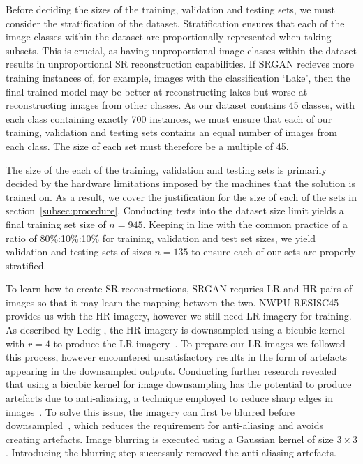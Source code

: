 Before deciding the sizes of the training, validation and testing sets, we must consider the stratification of the dataset. Stratification ensures that each of the image classes within the dataset are proportionally represented when taking subsets. This is crucial, as having unproportional image classes within the dataset results in unproportional SR reconstruction capabilities. If SRGAN recieves more training instances of, for example, images with the classification `Lake', then the final trained model may be better at reconstructing lakes but worse at reconstructing images from other classes. As our dataset contains 45 classes, with each class containing exactly 700 instances, we must ensure that each of our training, validation and testing sets contains an equal number of images from each class. The size of each set must therefore be a multiple of 45.

The size of the each of the training, validation and testing sets is primarily decided by the hardware limitations imposed by the machines that the solution is trained on. As a result, we cover the justification for the size of each of the sets in section~\ref{subsec:procedure}. Conducting tests into the dataset size limit yields a final training set size of $n = 945$. Keeping in line with the common practice of a ratio of 80\%:10\%:10\% for training, validation and test set sizes, we yield validation and testing sets of sizes $n = 135$ to ensure each of our sets are properly stratified.

To learn how to create SR reconstructions, SRGAN requries LR and HR pairs of images so that it may learn the mapping between the two. NWPU-RESISC45 provides us with the HR imagery, however we still need LR imagery for training. As described by Ledig \etal, the HR imagery is downsampled using a bicubic kernel with $r = 4$ to produce the LR imagery~\cite{srgan}. To prepare our LR images we followed this process, however encountered unsatisfactory results in the form of artefacts appearing in the downsampled outputs. Conducting further research revealed that using a bicubic kernel for image downsampling has the potential to produce artefacts due to anti-aliasing, a technique employed to reduce sharp edges in images~\cite{ref}. To solve this issue, the imagery can first be blurred before downsampled~\cite{ref}, which reduces the requirement for anti-aliasing and avoids creating artefacts. Image blurring is executed using a Gaussian kernel of size $3 \times 3$. Introducing the blurring step successuly removed the anti-aliasing artefacts.


